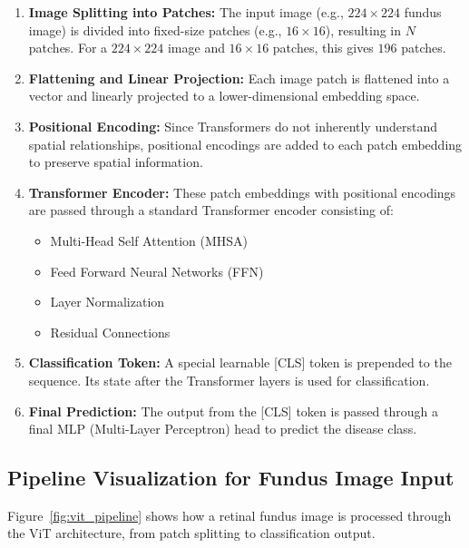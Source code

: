 \documentclass[a4paper,12pt]{report}
\begin{document}
\begin{enumerate}
    \item \textbf{Image Splitting into Patches:} The input image (e.g., $224 \times 224$ fundus image) is divided into fixed-size patches (e.g., $16 \times 16$), resulting in $N$ patches. For a $224 \times 224$ image and $16 \times 16$ patches, this gives $196$ patches.
    
    \item \textbf{Flattening and Linear Projection:} Each image patch is flattened into a vector and linearly projected to a lower-dimensional embedding space.
    
    \item \textbf{Positional Encoding:} Since Transformers do not inherently understand spatial relationships, positional encodings are added to each patch embedding to preserve spatial information.
    
    \item \textbf{Transformer Encoder:} These patch embeddings with positional encodings are passed through a standard Transformer encoder consisting of:
    \begin{itemize}
        \item Multi-Head Self Attention (MHSA)
        \item Feed Forward Neural Networks (FFN)
        \item Layer Normalization
        \item Residual Connections
    \end{itemize}
    
    \item \textbf{Classification Token:} A special learnable [CLS] token is prepended to the sequence. Its state after the Transformer layers is used for classification.
    
    \item \textbf{Final Prediction:} The output from the [CLS] token is passed through a final MLP (Multi-Layer Perceptron) head to predict the disease class.
\end{enumerate}

\subsection{Pipeline Visualization for Fundus Image Input}

Figure~\ref{fig:vit_pipeline} shows how a retinal fundus image is processed through the ViT architecture, from patch splitting to classification output.
\end{document}
